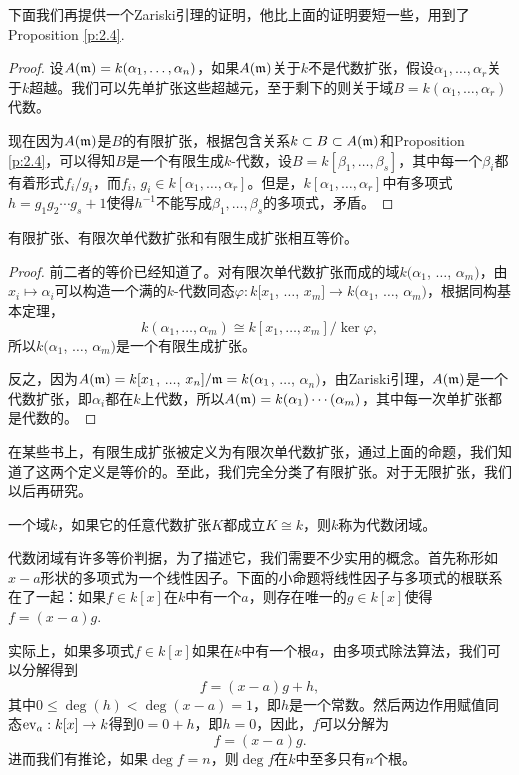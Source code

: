 下面我们再提供一个Zariski引理的证明，他比上面的证明要短一些，用到了Proposition \ref{p:2.4}.

\begin{proof} 设$A(\mathfrak{m})=k(\alpha_1,\dots,\alpha_n)$，如果$A(\mathfrak{m})$关于$k$不是代数扩张，假设$\alpha_1,\dots,\alpha_r$关于$k$超越。我们可以先单扩张这些超越元，至于剩下的则关于域$B=k(\alpha_1,\dots,\alpha_r)$代数。

现在因为$A(\mathfrak{m})$是$B$的有限扩张，根据包含关系$k\subset B\subset A(\mathfrak{m})$和Proposition \ref{p:2.4}，可以得知$B$是一个有限生成$k$-代数，设$B=k[\beta_1,\dots,\beta_s]$，其中每一个$\beta_i$都有着形式$f_i/g_i$，而$f_i$, $g_i\in k[\alpha_1,\dots,\alpha_r]$。但是，$k[\alpha_1,\dots,\alpha_r]$中有多项式$h=g_1g_2\cdots g_{s}+1$使得$h^{-1}$不能写成$\beta_1,\dots,\beta_s$的多项式，矛盾。\end{proof}

\begin{pro}
有限扩张、有限次单代数扩张和有限生成扩张相互等价。
\end{pro}

\begin{proof} 前二者的等价已经知道了。对有限次单代数扩张而成的域$k(\alpha_1$, $\dots$, $\alpha_m)$，由$x_i\mapsto \alpha_i$可以构造一个满的$k$-代数同态$\varphi:k[x_1$, $\dots$, $x_m]\to k(\alpha_1$, $\dots$, $\alpha_m)$，根据同构基本定理，
\[
	k(\alpha_1,\dots,\alpha_m)\cong k[x_1,\dots,x_m]/\ker \varphi,
\]
所以$k(\alpha_1$, $\dots$, $\alpha_m)$是一个有限生成扩张。

反之，因为$A(\mathfrak{m})=k[x_1$, $\dots$, $x_n]/\mathfrak{m}=k(\alpha_1$, $\dots$, $\alpha_n)$，由Zariski引理，$A(\mathfrak{m})$是一个代数扩张，即$\alpha_i$都在$k$上代数，所以$A(\mathfrak{m})=k(\alpha_1)\cdots(\alpha_m)$，其中每一次单扩张都是代数的。\end{proof}

在某些书上，有限生成扩张被定义为有限次单代数扩张，通过上面的命题，我们知道了这两个定义是等价的。至此，我们完全分类了有限扩张。对于无限扩张，我们以后再研究。

\begin{para}[代数闭域]
一个域$k$，如果它的任意代数扩张$K$都成立$K\cong k$，则$k$称为代数闭域。
\end{para}

代数闭域有许多等价判据，为了描述它，我们需要不少实用的概念。首先称形如$x-a$形状的多项式为一个线性因子。下面的小命题将线性因子与多项式的根联系在了一起：如果$f\in k[x]$在$k$中有一个$a$，则存在唯一的$g\in k[x]$使得$f=(x-a)g$.

实际上，如果多项式$f\in k[x]$如果在$k$中有一个根$a$，由多项式除法算法，我们可以分解得到
\[
	f=(x-a)g+h,
\]
其中$0\leq \deg(h)<\deg(x-a)=1$，即$h$是一个常数。然后两边作用赋值同态$\operatorname{ev}_a:k[x]\to k$得到$0=0+h$，即$h=0$，因此，$f$可以分解为
\[
	f=(x-a)g.
\]
进而我们有推论，如果$\deg f=n$，则$\deg f$在$k$中至多只有$n$个根。

